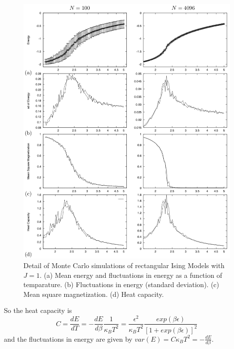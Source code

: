 \documentclass[openany]{memoir}
\begin{document}
\begin{figure}
\includegraphics[width=\textwidth]{./Monte.png}
\caption{Detail of Monte Carlo simulations of rectangular Ising Models with $J=1$. (a) Mean energy and fluctuations in energy as a function of temparature. (b) Fluctuations in energy (standard deviation). (c) Mean square magnetization. (d) Heat capacity.}
\end{figure}

So the heat capacity is
$$C = \frac{dE}{dT} = -\frac{dE}{d\beta} \frac{1}{\kappa_{B} T^2} = \frac{\epsilon^2}{\kappa_{B} T^2} \frac{exp(\beta \epsilon)}{[1 + exp(\beta \epsilon)]^2}$$
and the fluctuations in energy are given by $var(E) = C\kappa_{B} T^2 = -\frac{dE}{d\beta}$. 
\end{document}
